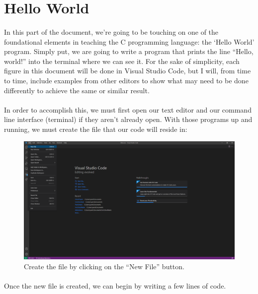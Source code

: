 \section{Hello World}

\paragraph{}
   In this part of the document, we're going to be touching on one of the foundational elements in teaching the C programming language: the `Hello World'
   program. Simply put, we are going to write a program that prints the line ``Hello, world!'' into the terminal where we can see it. For the sake of
   simplicity, each figure in this document will be done in Visual Studio Code, but I will, from time to time, include examples from other editors to
   show what may need to be done differently to achieve the same or similar result.

\paragraph{}
   In order to accomplish this, we must first open our text editor and our command line interface (terminal) if they aren't already open. With those
   programs up and running, we must create the file that our code will reside in:

\begin{figure}[h!]
   \includegraphics[width=\linewidth]{Figure1_VSCODE.png}
   \caption{Create the file by clicking on the ``New File'' button.}
   \label{fig:vscode_newfile}
\end{figure}

\paragraph{}
   Once the new file is created, we can begin by writing a few lines of code.

\begin{lstlisting}

\end{lstlisting}
